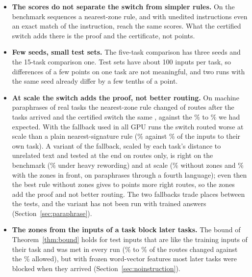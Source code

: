 \begin{itemize}
  also recognises tasks from frozen word-vectors, has no public code. We wrote it from its paper and
  ran it with a third of its epochs. It learned little, so we compare no scores. Its router gave
  every input to the right task and no answer changed. It was not run in the stress test
  (Appendix~\ref{app:latent}).
  \item \textbf{The scores do not separate the switch from simpler rules.} On the benchmark
  sequences a nearest-zone rule, and with unedited instructions even an exact match of the
  instruction, reach the same scores. What the certified switch adds there is the proof and the
  certificate, not points.
  \item \textbf{Few seeds, small test sets.} The five-task comparison has three seeds and the
  15-task comparison one. Test sets have about 100 inputs per task, so differences of a few points
  on one task are not meaningful, and two runs with the same seed already differ by a few tenths
  of a point.
  \item \textbf{At scale the switch adds the proof, not better routing.} On machine paraphrases of \WidenTasksEval{} real tasks the nearest-zone rule changed \RerouteNearNChanged{} of \RerouteInputs{} routes after the tasks arrived
  and the certified switch the same \RerouteCertNChanged{}, against the \RerouteExpectNearLow{}\% to \RerouteExpectNearHigh{}\% we had expected. With the fallback used in all GPU runs the switch routed worse at scale than a plain nearest-signature rule
  (\RerouteCertOwnEnd{}\% against \RerouteSigOwnEnd{}\% of the inputs to their own task). A variant of the fallback, scaled by each task's distance to unrelated text and tested at the end on routes only, is right on the benchmark (\RerouteBgHeavyFive{}\% under heavy rewording) and at scale
  (\RerouteBgItOwn{}\% without zones and \RerouteCertFourItOwn{}\% with the zones in front, on paraphrases through a fourth language); even then the best rule without zones gives \RerouteZonesCost{} to \RerouteZonesCostEs{} points more right routes, so the zones add the proof and not better routing. The two fallbacks trade places between the tests, and the variant has not been run with trained answers (Section~\ref{sec:paraphrase}).
  \item \textbf{The zones from the inputs of a task block later tasks.}
  The bound of Theorem~\ref{thm:bound} holds for test inputs that are like the training inputs of their task and was met in every run (\BoundAllChangedLow{}\% to \BoundAllChangedHigh{}\% of the routes changed against the \BoundAlpha{}\% allowed), but with frozen word-vector features most later tasks were blocked when they arrived (Section~\ref{sec:noinstruction}).

\end{itemize}
